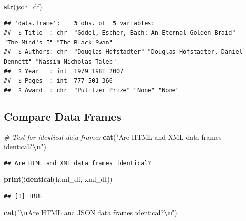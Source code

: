 \documentclass[
]{article}
\newenvironment{Shaded}{\begin{snugshade}}{\end{snugshade}}
\newcommand{\CommentTok}[1]{\textcolor[rgb]{0.56,0.35,0.01}{\textit{#1}}}
\newcommand{\FunctionTok}[1]{\textcolor[rgb]{0.13,0.29,0.53}{\textbf{#1}}}
\newcommand{\NormalTok}[1]{#1}
\newcommand{\SpecialCharTok}[1]{\textcolor[rgb]{0.81,0.36,0.00}{\textbf{#1}}}
\newcommand{\StringTok}[1]{\textcolor[rgb]{0.31,0.60,0.02}{#1}}
\begin{document}
\begin{Shaded}
\begin{Highlighting}[]
\FunctionTok{str}\NormalTok{(json\_df)}
\end{Highlighting}
\end{Shaded}

\begin{verbatim}
## 'data.frame':    3 obs. of  5 variables:
##  $ Title  : chr  "Gödel, Escher, Bach: An Eternal Golden Braid" "The Mind's I" "The Black Swan"
##  $ Authors: chr  "Douglas Hofstadter" "Douglas Hofstadter, Daniel Dennett" "Nassim Nicholas Taleb"
##  $ Year   : int  1979 1981 2007
##  $ Pages  : int  777 501 366
##  $ Award  : chr  "Pulitzer Prize" "None" "None"
\end{verbatim}

\subsection{Compare Data Frames}\label{compare-data-frames}

\begin{Shaded}
\begin{Highlighting}[]
\CommentTok{\# Test for identical data frames}
\FunctionTok{cat}\NormalTok{(}\StringTok{"Are HTML and XML data frames identical?}\SpecialCharTok{\textbackslash{}n}\StringTok{"}\NormalTok{)}
\end{Highlighting}
\end{Shaded}

\begin{verbatim}
## Are HTML and XML data frames identical?
\end{verbatim}

\begin{Shaded}
\begin{Highlighting}[]
\FunctionTok{print}\NormalTok{(}\FunctionTok{identical}\NormalTok{(html\_df, xml\_df))}
\end{Highlighting}
\end{Shaded}

\begin{verbatim}
## [1] TRUE
\end{verbatim}

\begin{Shaded}
\begin{Highlighting}[]
\FunctionTok{cat}\NormalTok{(}\StringTok{"}\SpecialCharTok{\textbackslash{}n}\StringTok{Are HTML and JSON data frames identical?}\SpecialCharTok{\textbackslash{}n}\StringTok{"}\NormalTok{)}
\end{Highlighting}
\end{Shaded}
\end{document}
